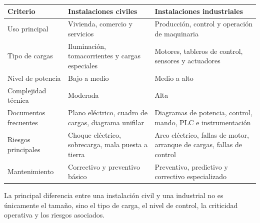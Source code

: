 \documentclass[
  spanish,
  letterpaper,
  DIV=11,
  numbers=noendperiod]{scrreprt}
\newcounter{none} %
\begin{document}
{\def\LTcaptype{none} %
\begin{longtable}[]{@{}
  >{\raggedright\arraybackslash}p{}
  >{\raggedright\arraybackslash}p{}
  >{\raggedright\arraybackslash}p{}@{}}
\toprule\noalign{}
\begin{minipage}[b]{\linewidth}\raggedright
Criterio
\end{minipage} & \begin{minipage}[b]{\linewidth}\raggedright
Instalaciones civiles
\end{minipage} & \begin{minipage}[b]{\linewidth}\raggedright
Instalaciones industriales
\end{minipage} \\
\midrule\noalign{}
\endhead
\bottomrule\noalign{}
\endlastfoot
Uso principal & Vivienda, comercio y servicios & Producción, control y
operación de maquinaria \\
Tipo de cargas & Iluminación, tomacorrientes y cargas especiales &
Motores, tableros de control, sensores y actuadores \\
Nivel de potencia & Bajo a medio & Medio a alto \\
Complejidad técnica & Moderada & Alta \\
Documentos frecuentes & Plano eléctrico, cuadro de cargas, diagrama
unifilar & Diagramas de potencia, control, mando, PLC e
instrumentación \\
Riesgos principales & Choque eléctrico, sobrecarga, mala puesta a tierra
& Arco eléctrico, fallas de motor, arranque de cargas, fallas de
control \\
Mantenimiento & Correctivo y preventivo básico & Preventivo, predictivo
y correctivo especializado \\
\end{longtable}
}

\begin{tcolorbox}[enhanced jigsaw, arc=.35mm, bottomrule=.15mm, bottomtitle=1mm, breakable, colback=white, colbacktitle=quarto-callout-important-color!10!white, colframe=quarto-callout-important-color-frame, coltitle=black, left=2mm, leftrule=.75mm, opacityback=0, opacitybacktitle=0.6, rightrule=.15mm, title=\textcolor{quarto-callout-important-color}{\faExclamation}\hspace{0.5em}{Importante}, titlerule=0mm, toprule=.15mm, toptitle=1mm]

La principal diferencia entre una instalación civil y una industrial no
es únicamente el tamaño, sino el tipo de carga, el nivel de control, la
criticidad operativa y los riesgos asociados.

\end{tcolorbox}
\end{document}
